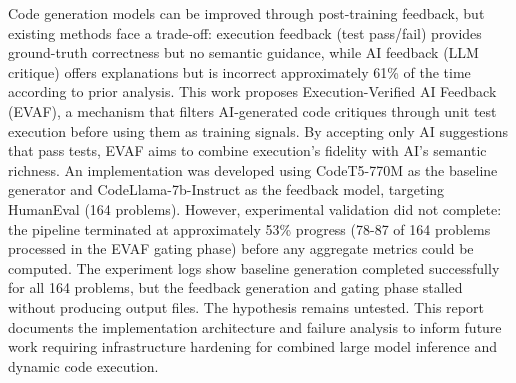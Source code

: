 
Code generation models can be improved through post-training feedback, but existing methods face a trade-off: execution feedback (test pass/fail) provides ground-truth correctness but no semantic guidance, while AI feedback (LLM critique) offers explanations but is incorrect approximately 61\% of the time according to prior analysis. This work proposes Execution-Verified AI Feedback (EVAF), a mechanism that filters AI-generated code critiques through unit test execution before using them as training signals. By accepting only AI suggestions that pass tests, EVAF aims to combine execution's fidelity with AI's semantic richness. An implementation was developed using CodeT5-770M as the baseline generator and CodeLlama-7b-Instruct as the feedback model, targeting HumanEval (164 problems). However, experimental validation did not complete: the pipeline terminated at approximately 53\% progress (78-87 of 164 problems processed in the EVAF gating phase) before any aggregate metrics could be computed. The experiment logs show baseline generation completed successfully for all 164 problems, but the feedback generation and gating phase stalled without producing output files. The hypothesis remains untested. This report documents the implementation architecture and failure analysis to inform future work requiring infrastructure hardening for combined large model inference and dynamic code execution.
